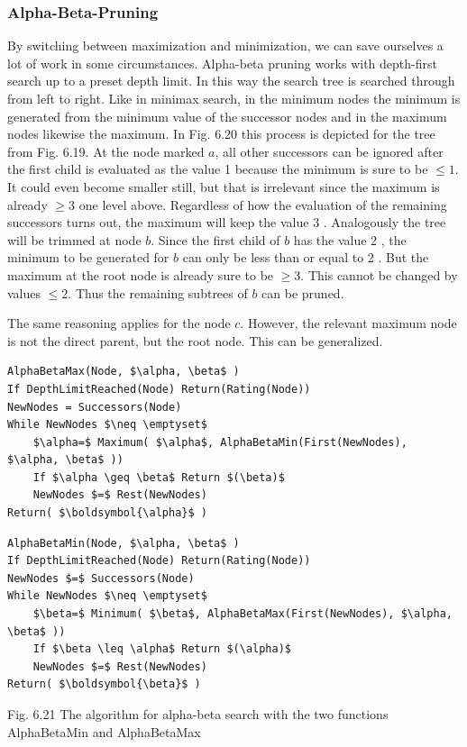 \documentclass[10pt]{article}
\begin{document}
\subsubsection*{Alpha-Beta-Pruning}
By switching between maximization and minimization, we can save ourselves a lot of work in some circumstances. Alpha-beta pruning works with depth-first search up to a preset depth limit. In this way the search tree is searched through from left to right. Like in minimax search, in the minimum nodes the minimum is generated from the minimum value of the successor nodes and in the maximum nodes likewise the maximum. In Fig. 6.20 this process is depicted for the tree from Fig. 6.19. At the node marked $a$, all other successors can be ignored after the first child is evaluated as the value 1 because the minimum is sure to be $\leq 1$. It could even become smaller still, but that is irrelevant since the maximum is already $\geq 3$ one level above. Regardless of how the evaluation of the remaining successors turns out, the maximum will keep the value 3 . Analogously the tree will be trimmed at node $b$. Since the first child of $b$ has the value 2 , the minimum to be generated for $b$ can only be less than or equal to 2 . But the maximum at the root node is already sure to be $\geq 3$. This cannot be changed by values $\leq 2$. Thus the remaining subtrees of $b$ can be pruned.

The same reasoning applies for the node $c$. However, the relevant maximum node is not the direct parent, but the root node. This can be generalized.

\begin{verbatim}
AlphaBetaMax(Node, $\alpha, \beta$ )
If DepthLimitReached(Node) Return(Rating(Node))
NewNodes = Successors(Node)
While NewNodes $\neq \emptyset$
    $\alpha=$ Maximum( $\alpha$, AlphaBetaMin(First(NewNodes), $\alpha, \beta$ ))
    If $\alpha \geq \beta$ Return $(\beta)$
    NewNodes $=$ Rest(NewNodes)
Return( $\boldsymbol{\alpha}$ )
\end{verbatim}

\begin{verbatim}
AlphaBetaMin(Node, $\alpha, \beta$ )
If DepthLimitReached(Node) Return(Rating(Node))
NewNodes $=$ Successors(Node)
While NewNodes $\neq \emptyset$
    $\beta=$ Minimum( $\beta$, AlphaBetaMax(First(NewNodes), $\alpha, \beta$ ))
    If $\beta \leq \alpha$ Return $(\alpha)$
    NewNodes $=$ Rest(NewNodes)
Return( $\boldsymbol{\beta}$ )
\end{verbatim}

Fig. 6.21 The algorithm for alpha-beta search with the two functions AlphaBetaMin and AlphaBetaMax
\end{document}
